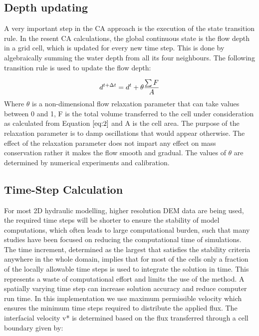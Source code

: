 \subsection*{Depth updating}
A very important step in the CA approach is the execution of the state transition rule. In the resent CA calculations, the global continuous state is the flow depth in a grid cell, which is updated for every new time step. This is done by algebraically summing the water depth from all its four neighbours. The following transition rule is used to update the flow depth:

\begin{equation} \label{eq:3}
	\Large d^{t+\Delta{t}} = d^{t} + \theta \frac{\sum F}{A}
\end{equation}
Where $\theta$ is a non-dimensional flow relaxation parameter that can take values between 0 and 1, F is the total volume transferred to the cell under consideration as calculated from Equation $\ref{eq:2}$ and A is the cell area. The purpose of the relaxation parameter is to damp oscillations that would appear otherwise. The effect of the relaxation parameter does not impart any effect on mass conservation rather it makes the flow smooth and gradual. The values of $\theta$ are determined by numerical experiments and calibration.

\subsection*{Time-Step Calculation}

For most 2D hydraulic modelling, higher resolution DEM data are being used, the required time steps will be shorter to ensure the stability of model computations, which often leads to large computational burden, such that many studies have been focused on reducing the computational time of simulations. The time increment, determined as the largest that satisfies the stability criteria anywhere in the whole domain, implies that for most of the cells only a fraction of the locally allowable time steps is used to integrate the solution in time. This represents a waste of computational effort and limits the use of the method. A spatially varying time step can increase solution accuracy and reduce computer run time. In this implementation we use maximum permissible velocity which ensures the minimum time steps required to distribute the applied flux. The interfacial velocity v* is determined based on the flux transferred through a cell boundary given by:

